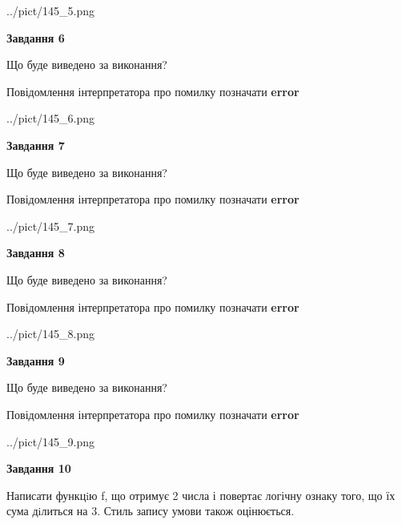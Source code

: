 \documentclass[12pt, ukrainian]{article}
\begin{document}
{\begin {large}
\begin{center}
	{../pict/145_5.png}
\end{center}
\newpage

{\begin {center}\textbf{Завдання 6}\end {center}}\par
Що буде виведено за виконання? \par
Повідомлення інтерпретатора про помилку позначати \textbf{error}

\begin{center}
	{../pict/145_6.png}
\end{center}
\newpage

{\begin {center}\textbf{Завдання 7}\end {center}}\par
Що буде виведено за виконання? \par
Повідомлення інтерпретатора про помилку позначати \textbf{error}

\begin{center}
	{../pict/145_7.png}
\end{center}
\newpage

{\begin {center}\textbf{Завдання 8}\end {center}}\par
Що буде виведено за виконання? \par
Повідомлення інтерпретатора про помилку позначати \textbf{error}

\begin{center}
	{../pict/145_8.png}
\end{center}
\newpage

{\begin {center}\textbf{Завдання 9}\end {center}}\par
Що буде виведено за виконання? \par
Повідомлення інтерпретатора про помилку позначати \textbf{error}

\begin{center}
	{../pict/145_9.png}
\end{center}
\newpage

{\begin {center}\textbf{Завдання 10}\end {center}}\par

Написати функцiю f, що отримує 2 числа і повертає логічну ознаку того, що їх сума дiлиться на 3. Стиль запису умови також оцінюється.\par
\newpage

\end {large}}
\end{document}
